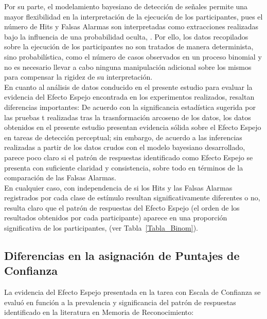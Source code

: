 Por su parte, el modelamiento bayesiano de detección de señales permite una mayor flexibilidad en la interpretación de la ejecución de los participantes, pues el número de Hits y Falsas Alarmas son interpretadas como extracciones realizadas bajo la influencia de una probabilidad oculta, \parencite{LeeBook}. Por ello, los datos recopilados sobre la ejecución de los participantes no son tratados de manera determinista, sino probabilística, como el número de casos observados en un proceso binomial y no es necesario llevar a cabo ninguna manipulación adicional sobre los mismos para compensar la rigidez de su interpretación.\\

En cuanto al análisis de datos conducido en el presente estudio para evaluar la evidencia del Efecto Espejo encontrada en los experimentos realizados, resaltan diferencias importantes: De acuerdo con la significancia estadística sugerida por las pruebas t realizadas tras la trasnformación arcoseno de los datos, los datos obtenidos en el presente estudio presentan evidencia sólida sobre el Efecto Espejo en tareas de detección perceptual; sin embargo, de acuerdo a las inferencias realizadas a partir de los datos crudos con el modelo bayesiano desarrollado, parece poco claro si el patrón de respuestas identificado como Efecto Espejo se presenta con suficiente claridad y consistencia, sobre todo en términos de la comparación de las Falsas Alarmas.\\

En cualquier caso, con independencia de si los Hits y las Falsas Alarmas registrados por cada clase de estímulo resultan significativamente diferentes o no, resulta claro que el patrón de respuestas del Efecto Espejo (el orden de los resultados obtenidos por cada participante) aparece en una proporción significativa de los participantes, (ver Tabla~\ref{Tabla_Binom}).\\ 















\subsection{Diferencias en la asignación de Puntajes de Confianza}

La evidencia del Efecto Espejo presentada en la tarea con Escala de Confianza se evaluó en función a la prevalencia y significancia del patrón de respuestas identificado en la literatura en Memoria de Reconocimiento:\\
 
